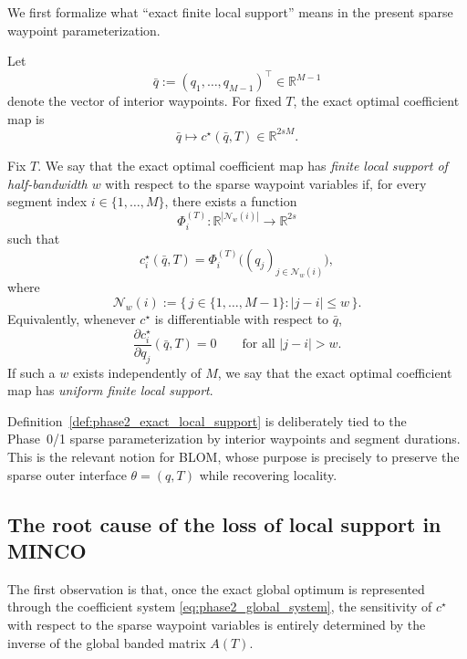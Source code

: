 We first formalize what ``exact finite local support'' means in the present sparse waypoint parameterization.

Let
\[
\bar q := (q_1,\dots,q_{M-1})^\top \in \mathbb R^{M-1}
\]
denote the vector of interior waypoints.
For fixed \(T\), the exact optimal coefficient map is
\[
\bar q \longmapsto c^\star(\bar q,T)\in\mathbb R^{2sM}.
\]

\begin{definition}
\label{def:phase2_exact_local_support}
Fix \(T\).
We say that the exact optimal coefficient map has \emph{finite local support of half-bandwidth \(w\)} with respect to the sparse waypoint variables if, for every segment index \(i\in\{1,\dots,M\}\), there exists a function
\[
\Phi_i^{(T)}:\mathbb R^{|\mathcal N_w(i)|}\to\mathbb R^{2s}
\]
such that
\begin{equation}
\label{eq:phase2_local_map}
c_i^\star(\bar q,T)
=
\Phi_i^{(T)}\!\bigl((q_j)_{j\in \mathcal N_w(i)}\bigr),
\end{equation}
where
\[
\mathcal N_w(i)
:=
\{\,j\in\{1,\dots,M-1\}: |j-i|\le w\,\}.
\]
Equivalently, whenever \(c^\star\) is differentiable with respect to \(\bar q\),
\begin{equation}
\label{eq:phase2_local_support_jacobian}
\frac{\partial c_i^\star}{\partial q_j}(\bar q,T)=0
\qquad
\text{for all } |j-i|>w.
\end{equation}
If such a \(w\) exists independently of \(M\), we say that the exact optimal coefficient map has \emph{uniform finite local support}.
\end{definition}

\begin{remark}
\label{rem:phase2_scope_of_definition}
Definition~\ref{def:phase2_exact_local_support} is deliberately tied to the Phase~0/1 sparse parameterization by interior waypoints and segment durations.
This is the relevant notion for BLOM, whose purpose is precisely to preserve the sparse outer interface \(\theta=(q,T)\) while recovering locality.
\end{remark}

\subsection{The root cause of the loss of local support in MINCO}
\label{subsec:phase2_root_cause}

The first observation is that, once the exact global optimum is represented through the coefficient system \eqref{eq:phase2_global_system}, the sensitivity of \(c^\star\) with respect to the sparse waypoint variables is entirely determined by the inverse of the global banded matrix \(A(T)\).

